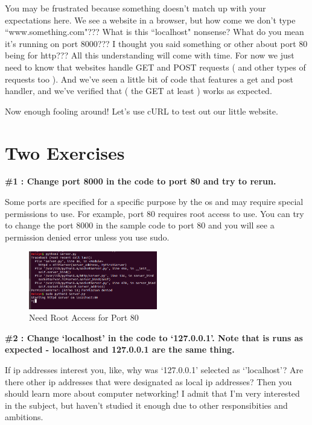 \documentclass[10pt]{article}
\begin{document}
You may be frustrated because something doesn't match up with your expectations here. We see a website in a browser, but how come we don't type ``www.something.com"??? What is this ``localhost" nonsense? What do you mean it's running on port 8000??? I thought you said something or other about port 80 being for http??? All this understanding will come with time. For now we just need to know that websites handle GET and POST requests ( and other types of requests too ). And we've seen a little bit of code that features a get and post handler, and we've verified that ( the GET at least ) works as expected.

Now enough fooling around! Let's use cURL to test out our little website.

\section{Two Exercises}
\begin{center}
\textbf{ \#1 : Change port 8000 in the code to port 80 and try to rerun.}
\end{center}

Some ports are specified for a specific purpose by the os and may require special permissions to use. For example, port 80 requires root access to use. You can try to change the port 8000 in the sample code to port 80 and you will see a permission denied error unless you use sudo.

\begin{figure}[h]
  \centering
    \includegraphics[width=0.5\textwidth]{needRootFor80.png}
  \caption{Need Root Access for Port 80}
\end{figure}


\begin{center}
\textbf{\#2 : Change `localhost' in the code to `127.0.0.1'. Note that is runs as expected - localhost and 127.0.0.1 are the same thing.}
\end{center}

If ip addresses interest you, like, why was `127.0.0.1' selected as `'localhost'? Are there other ip addresses that were designated as local ip addresses? Then you should learn more about computer networking! I admit that I'm very interested in the subject, but haven't studied it enough due to other responsibities and ambitions.
\end{document}

